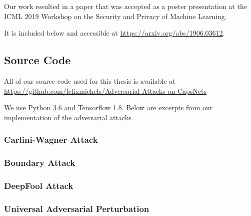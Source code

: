 Our work resulted in a paper that was accepted as a poster presentation at the ICML 2019 Workshop on the Security and Privacy of Machine Learning.

It is included below and accessible at \url{https://arxiv.org/abs/1906.03612}.



\subsection{Source Code}

All of our source code used for this thesis is available at \url{https://github.com/felixmichels/Adversarial-Attacks-on-CapsNets}

We use Python 3.6 and Tensorflow 1.8.
Below are excerpts from our implementation of the adversarial attacks.

\subsubsection{Carlini-Wagner Attack}


\subsubsection{Boundary Attack}


\subsubsection{DeepFool Attack}


\subsubsection{Universal Adversarial Perturbation}




